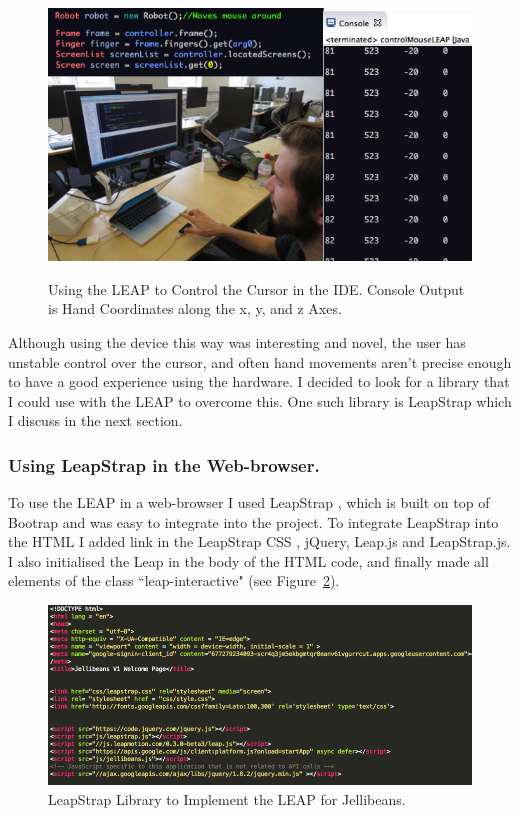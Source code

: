 \documentclass[a4paper, 11pt]{article}
\begin{document}
\begin{figure}[H]
\begin{center}
\includegraphics[scale=0.65]{Monty1}\\
\caption{Using the LEAP to Control the Cursor in the IDE. Console Output is Hand Coordinates along the x, y, and z Axes.}
\label{Monty}
\end{center}
\end{figure}

Although using the device this way was interesting and novel, the user has unstable control over the cursor, and often hand movements aren't precise enough to have a good experience using the hardware. I decided to look for a library that I could use with the LEAP to overcome this. One such library is LeapStrap which I discuss in the next section.


\subsubsection{Using LeapStrap in the Web-browser.}
To use the LEAP in a web-browser I used LeapStrap \cite{leapstrap}, which is built on top of Bootrap and was easy to integrate into the project. To integrate LeapStrap into the HTML I added link in the LeapStrap CSS , jQuery, Leap.js and LeapStrap.js. I also initialised the Leap in the body of the HTML code, and finally made all elements of the class ``leap-interactive" (see Figure~\ref{leapstrap}). 

\begin{figure}[H]
\begin{center}
\includegraphics[scale=0.55]{leapstrap}
\caption{LeapStrap Library to Implement the LEAP for Jellibeans.}
\label{leapstrap}
\end{center}
\end{figure}
\end{document}
